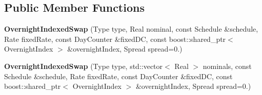 \subsection*{Public Member Functions}
\begin{DoxyCompactItemize}
\item 
{\bfseries Overnight\+Indexed\+Swap} (Type type, Real nominal, const Schedule \&schedule, Rate fixed\+Rate, const Day\+Counter \&fixed\+DC, const boost\+::shared\+\_\+ptr$<$ Overnight\+Index $>$ \&overnight\+Index, Spread spread=0.)\label{class_quant_lib_1_1_overnight_indexed_swap_aba3ddfc270dd15d685dcbd5161973fc8}

\item 
{\bfseries Overnight\+Indexed\+Swap} (Type type, std\+::vector$<$ Real $>$ nominals, const Schedule \&schedule, Rate fixed\+Rate, const Day\+Counter \&fixed\+DC, const boost\+::shared\+\_\+ptr$<$ Overnight\+Index $>$ \&overnight\+Index, Spread spread=0.)\label{class_quant_lib_1_1_overnight_indexed_swap_aca2b863e4ba579f58603494cce6ce575}

\end{DoxyCompactItemize}
